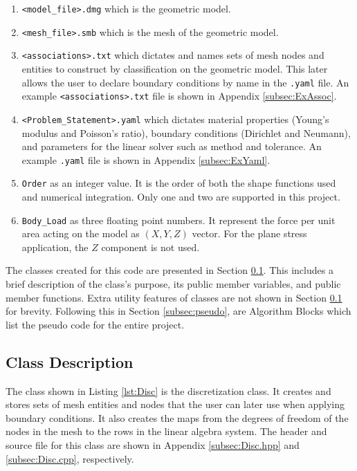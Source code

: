 \documentclass[a4paper, 12pt]{article}
\begin{document}
\begin{enumerate}
  \item \texttt{<model\_file>.dmg} which is the geometric model.
  \item \texttt{<mesh\_file>.smb} which is the mesh of the
        geometric model.
  \item \texttt{<associations>.txt} which dictates and names sets of
        mesh nodes and entities to construct by classification on the
        geometric model. This later allows the user to declare
        boundary conditions by name in the \texttt{.yaml} file.
        An example \texttt{<associations>.txt} file is shown in
        Appendix \ref{subsec:ExAssoc}.
  \item \texttt{<Problem\_Statement>.yaml} which dictates material
        properties (Young's modulus and Poisson's ratio),
        boundary conditions (Dirichlet and Neumann), and parameters
        for the linear solver such as method and tolerance. An
        example \texttt{.yaml} file is shown in Appendix \ref{subsec:ExYaml}.
  \item \texttt{Order} as an integer value. It is the order of
        both the shape functions used and numerical integration.
        Only one and two are supported in this project.
  \item \texttt{Body\_Load} as three floating point numbers.
        It represent the force per unit area acting on the model
        as $(X, Y, Z)$ vector. For the plane stress application,
        the $Z$ component is not used.
\end{enumerate}

\noindent
The classes created for this code are presented
in Section \ref{subsec:class}.
This includes a brief description of the class's purpose,
its public member variables, and public member functions.
Extra utility features of classes are not shown in
Section \ref{subsec:class} for brevity.  Following this in
Section \ref{subsec:pseudo}, are Algorithm Blocks which list the
pseudo code for the entire project.

\subsection{Class Description} \label{subsec:class}
The class shown in Listing \ref{lst:Disc} is the discretization
class. It creates and stores sets of mesh entities and nodes that the user
can later use when applying boundary conditions. It also
creates the maps from the degrees of freedom of the nodes
in the mesh to the rows in the linear algebra system.
The header and source file for this class are shown in
Appendix \ref{subsec:Disc.hpp} and \ref{subsec:Disc.cpp},
respectively.
\end{document}
